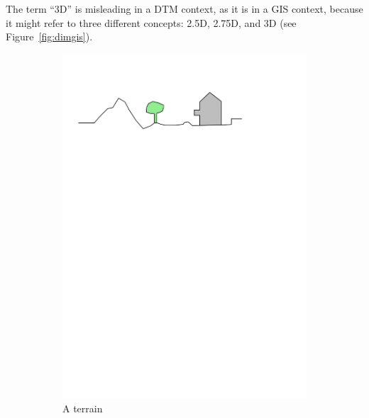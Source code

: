 The term ``3D'' is misleading in a DTM context, as it is in a GIS context, 
because it might refer to three different concepts: 2.5D, 2.75D, and 3D (see Figure~\ref{fig:dimgis}).
\begin{figure}[b]
  \centering
  \begin{subfigure}[b]{0.45\linewidth}
    \centering
    \includegraphics[page=1,width=\linewidth]{figs/dimgis}
    \caption{A terrain}\label{fig:dimgis:1}
  \end{subfigure}%
  \qquad %
  \begin{subfigure}[b]{0.45\linewidth}
    \centering

\end{subfigure}
\end{figure}
